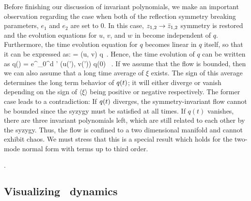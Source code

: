Before finishing our discussion of invariant polynomials, we make an
important observation regarding the case when both of the reflection symmetry breaking
parameters, $e_{1}$ and $e_2$ are set to $0$. In this case, $z_{1,2} \rightarrow \bar{z}_{1,2}$
symmetry is restored and the evolution equations for $u$, $v$, and $w$ in  become
independent of $q$. Furthermore, the time evolution equation for $q$ becomes linear in $q$ itself, so that
it can be expressed as:
\beq
     = \xi (u, v) q \,.
Hence, the time evolution of $q$ can be written as
\beq
    q(\zeit) =  e^{\int_0^\zeit d \zeit' \xi (u(\zeit'), v(\zeit'))} q(0) \, .
If we assume that the flow is bounded, then we can also assume that a long time
average of $\xi$ exists. The sign of this average determines the long term
behavior of $q(t)$; it will either diverge or vanish depending on the sign of
$\langle \xi \rangle$ being positive or negative respectively. The former case
leads to a contradiction: If $q(t)$ diverges, the symmetry-invariant flow cannot
be bounded since the syzygy  must be satisfied at all times. If
$q(t)$ vanishes, there are three invariant polynomials left, which are still
related to each other by the syzygy. Thus, the flow is confined
to a two dimensional manifold and cannot exhibit chaos. 
We must stress that this is a special result which holds for the two-mode 
normal form with terms up to third order.

.

\subsection{Visualizing \twomode\ dynamics}
\label{s:visual}

